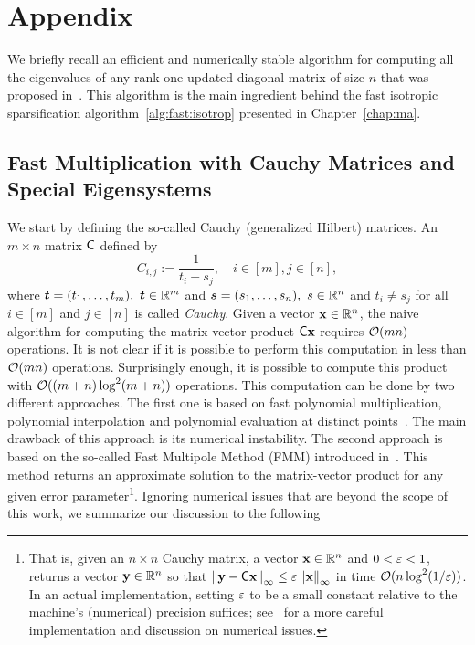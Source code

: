 \chapter*{Appendix}
We briefly recall an efficient and numerically stable algorithm for computing all the eigenvalues of any rank-one updated diagonal matrix of size $n$ that was proposed in~\cite{Gu:update}. This algorithm is the main ingredient behind the fast isotropic sparsification algorithm~\ref{alg:fast:isotrop} presented in Chapter~\ref{chap:ma}.
\section*{Fast Multiplication with Cauchy Matrices and Special Eigensystems}
We start by defining the so-called Cauchy (generalized Hilbert) matrices. An $m\times n$ matrix ${\mathsf{C} }$ defined by
\[ C_{i,j} := \frac1{t_i - s_j},\quad i\in{[m]},j\in{[n]},\]
where $\vct{t}=(t_1,\ldots ,t_m),\ \vct{t}\in\reals^m$ and $\bm{s}=(s_1,\ldots ,s_n),\ s\in\mathbb{R}^n$  and $t_i\neq s_j$ for all $i\in{[m]}$ and $j\in{[n]}$ is called \emph{Cauchy}. Given a vector $\mathbf{x}\in\mathbb{R}^n$, the naive algorithm for computing the matrix-vector product ${\mathsf{C} } \mathbf{x}$ requires $\mathcal{O}(mn)$ operations. It is not clear if it is possible to perform this computation in less than $\mathcal{O}(mn)$ operations. Surprisingly enough, it is possible to compute this product with $\mathcal{O}((m+n)\log^2 (m+n))$ operations. This computation can be done by two different approaches. The first one is based on fast polynomial multiplication, polynomial interpolation and polynomial evaluation at distinct points~\cite[Algorithm~$1$, p.~$130$]{book:fast_matrix:Bini_Pan}. The main drawback of this approach is its numerical instability. The second approach is based on the so-called Fast Multipole Method (FMM) introduced in~\cite{FMM:CGR}. This method returns an approximate solution to the matrix-vector product for any given error parameter\footnote{That is, given an $n\times n$ Cauchy matrix, a vector $\mathbf{x}\in\mathbb{R}^n$ and $0<\varepsilon< 1$, returns a vector $\mathbf{y}\in\mathbb{R}^n$ so that $\left\|\mathbf{y} - {\mathsf{C} }\mathbf{x}\right\|_\infty \leq \varepsilon \left\|\mathbf{x}\right\|_\infty$ in time $\mathcal{O}(n \log^2 (1/\varepsilon))$. In an actual implementation, setting $\varepsilon$ to be a small constant relative to the machine's (numerical) precision suffices; see~\cite[\S~$3$]{Gu:update} for a more careful implementation and discussion on numerical issues.}. Ignoring numerical issues that are beyond the scope of this work, we summarize our discussion to the following
